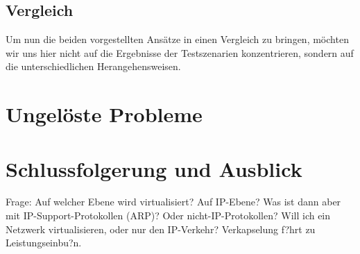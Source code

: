 \documentclass{lni}
\begin{document}
\subsection{Vergleich}
\label{subsec:svne_vergleich}

Um nun die beiden vorgestellten Ansätze in einen Vergleich zu bringen, möchten wir uns hier nicht auf die Ergebnisse der Testszenarien konzentrieren, sondern auf die unterschiedlichen Herangehensweisen.




\section{Ungelöste Probleme}
\label{sec:offenefragen}

\section{Schlussfolgerung und Ausblick}
\label{sec:schluss}
Frage: Auf welcher Ebene wird virtualisiert? Auf IP-Ebene? Was ist dann aber mit IP-Support-Protokollen (ARP)? Oder nicht-IP-Protokollen? Will ich ein Netzwerk virtualisieren, oder nur den IP-Verkehr? Verkapselung f?hrt zu Leistungseinbu?n. \cite{cabuk2007towards}



{}
\end{document}
